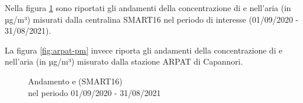 Nella figura \ref{fig:smart16-pm} sono riportati gli andamenti della concentrazione di  e  nell'aria (in µg/m³) misurati dalla centralina SMART16 nel periodo di interesse (01/09/2020 - 31/08/2021).

La figura \ref{fig:arpat-pm} invece riporta gli andamenti della concentrazione di  e  nell'aria (in µg/m³) misurato dalla stazione ARPAT di Capannori.

\begin{figure}[H]%
    \centering
    \captionsetup{justification=centering}
    \caption{Andamento  e  (SMART16)\\nel periodo 01/09/2020 - 31/08/2021}%
    \label{fig:smart16-pm}%
\end{figure}

